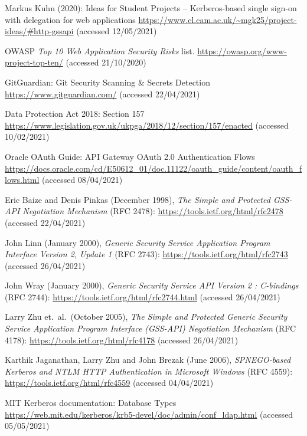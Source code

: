 \documentclass[12pt]{report}
\begin{document}
\begin{thebibliography}{99}
 Markus Kuhn (2020): Ideas for Student Projects -- Kerberos-based single sign-on with delegation for web applications \url{https://www.cl.cam.ac.uk/~mgk25/project-ideas/#http-gssapi} (accessed 12/05/2021)

 OWASP \textit{Top 10 Web Application Security Risks} list. \url{https://owasp.org/www-project-top-ten/} (accessed 21/10/2020)

 GitGuardian: Git Security Scanning \& Secrets Detection \url{https://www.gitguardian.com/} (accessed 22/04/2021)

 Data Protection Act 2018: Section 157 \url{https://www.legislation.gov.uk/ukpga/2018/12/section/157/enacted} (accessed 10/02/2021)

 Oracle OAuth Guide: API Gateway OAuth 2.0 Authentication Flows \url{https://docs.oracle.com/cd/E50612_01/doc.11122/oauth_guide/content/oauth_flows.html} (accessed 08/04/2021)

 Eric Baize and Denis Pinkas (December 1998), \textit{The Simple and Protected GSS-API Negotiation Mechanism} (RFC 2478): \url{https://tools.ietf.org/html/rfc2478} (accessed 22/04/2021)

 John Linn (January 2000), \textit{Generic Security Service Application Program Interface Version 2, Update 1} (RFC 2743): \url{https://tools.ietf.org/html/rfc2743} (accessed 26/04/2021)

 John Wray (January 2000), \textit{Generic Security Service API Version 2 : C-bindings} (RFC 2744): \url{https://tools.ietf.org/html/rfc2744.html} (accessed 26/04/2021)

 Larry Zhu et.\ al.\ (October 2005), \textit{The Simple and Protected Generic Security Service Application Program Interface (GSS-API) Negotiation Mechanism} (RFC 4178): \url{https://tools.ietf.org/html/rfc4178} (accessed 26/04/2021)

 Karthik Jaganathan, Larry Zhu and John Brezak (June 2006), \textit{SPNEGO-based Kerberos and NTLM HTTP Authentication in Microsoft Windows} (RFC 4559): \url{https://tools.ietf.org/html/rfc4559} (accessed 04/04/2021)

 MIT Kerberos documentation: Database Types \url{https://web.mit.edu/kerberos/krb5-devel/doc/admin/conf_ldap.html} (accessed 05/05/2021)


\end{thebibliography}
\end{document}
